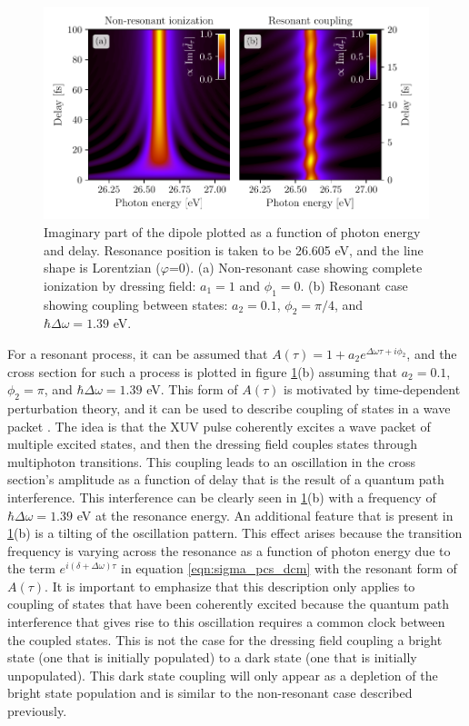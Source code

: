 \begin{figure}
	\centering
	\includegraphics[width=1.0\textwidth]{figures/ATS/resonant_vs_non_resonant.pdf}
	\caption{Imaginary part of the dipole plotted as a function of photon energy and delay. Resonance position is taken to be 26.605 eV, and the line shape is Lorentzian ($\varphi$=0).  (a) Non-resonant case showing complete ionization by dressing field: $a_1=1$ and $\phi_{1}=0$.  (b) Resonant case showing coupling between states: $a_2=0.1$, $\phi_{2}=\pi/4$, and  $\hbar\Delta\omega=1.39$ eV.}
	\label{fig:res_vs_non_res}
\end{figure}

For a resonant process, it can be assumed that $A(\tau)=1+a_2e^{\Delta\omega\tau + i\phi_2}$, and the cross section for such a process is plotted in figure \ref{fig:res_vs_non_res}(b) assuming that $a_2=0.1$, $\phi_2=\pi$, and $\hbar\Delta\omega = 1.39$ eV.  This form of $A(\tau)$ is motivated by time-dependent perturbation theory, and it can be used to describe coupling of states in a wave packet \cite{blattermannImpulsiveControlAtomic2016, blattermannTwodimensionalSpectralInterpretation2014, ottReconstructionControlTimedependent2014, kaldunFanoResonancesTime2014}.  The idea is that the XUV pulse coherently excites a wave packet of multiple excited states, and then the dressing field couples states through multiphoton transitions. This coupling leads to an oscillation in the cross section's amplitude as a function of delay that is the result of a quantum path interference.  This interference can be clearly seen in \ref{fig:res_vs_non_res}(b) with a frequency of $\hbar\Delta\omega=1.39$ eV at the resonance energy.  An additional feature that is present in \ref{fig:res_vs_non_res}(b) is a tilting of the oscillation pattern.  This effect arises because the transition frequency is varying across the resonance as a function of photon energy due to the term $e^{i(\delta+\Delta\omega)\tau}$ in equation \ref{eqn:sigma_pcs_dcm} with the resonant form of $A(\tau)$.  It is important to emphasize that this description only applies to coupling of states that have been coherently excited because the quantum path interference that gives rise to this oscillation requires a common clock between the coupled states.  This is not the case for the dressing field coupling a bright state (one that is initially populated) to a dark state (one that is initially unpopulated).  This dark state coupling will only appear as a depletion of the bright state population and is similar to the non-resonant case described previously.

